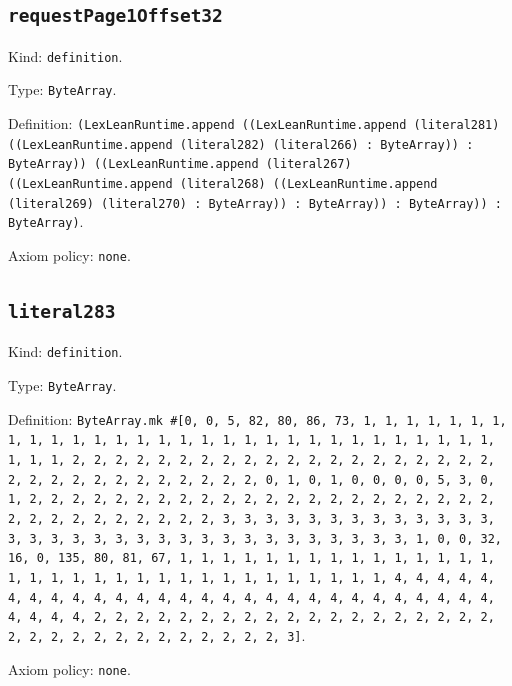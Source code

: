 \documentclass[11pt]{article}
\begin{document}
\subsection*{\texttt{requestPage1Offset32}}
\noindent Kind: \texttt{definition}.\par
\noindent Type: \texttt{ByteArray}.\par
\noindent Definition: \texttt{(LexLeanRuntime.append ((LexLeanRuntime.append (literal281) ((LexLeanRuntime.append (literal282) (literal266) : ByteArray)) : ByteArray)) ((LexLeanRuntime.append (literal267) ((LexLeanRuntime.append (literal268) ((LexLeanRuntime.append (literal269) (literal270) : ByteArray)) : ByteArray)) : ByteArray)) : ByteArray)}.\par
\noindent Axiom policy: \texttt{none}.\par
\subsection*{\texttt{literal283}}
\noindent Kind: \texttt{definition}.\par
\noindent Type: \texttt{ByteArray}.\par
\noindent Definition: \texttt{ByteArray.mk \#[0, 0, 5, 82, 80, 86, 73, 1, 1, 1, 1, 1, 1, 1, 1, 1, 1, 1, 1, 1, 1, 1, 1, 1, 1, 1, 1, 1, 1, 1, 1, 1, 1, 1, 1, 1, 1, 1, 1, 1, 2, 2, 2, 2, 2, 2, 2, 2, 2, 2, 2, 2, 2, 2, 2, 2, 2, 2, 2, 2, 2, 2, 2, 2, 2, 2, 2, 2, 2, 2, 2, 2, 0, 1, 0, 1, 0, 0, 0, 0, 5, 3, 0, 1, 2, 2, 2, 2, 2, 2, 2, 2, 2, 2, 2, 2, 2, 2, 2, 2, 2, 2, 2, 2, 2, 2, 2, 2, 2, 2, 2, 2, 2, 2, 2, 2, 3, 3, 3, 3, 3, 3, 3, 3, 3, 3, 3, 3, 3, 3, 3, 3, 3, 3, 3, 3, 3, 3, 3, 3, 3, 3, 3, 3, 3, 3, 3, 3, 1, 0, 0, 32, 16, 0, 135, 80, 81, 67, 1, 1, 1, 1, 1, 1, 1, 1, 1, 1, 1, 1, 1, 1, 1, 1, 1, 1, 1, 1, 1, 1, 1, 1, 1, 1, 1, 1, 1, 1, 1, 1, 1, 4, 4, 4, 4, 4, 4, 4, 4, 4, 4, 4, 4, 4, 4, 4, 4, 4, 4, 4, 4, 4, 4, 4, 4, 4, 4, 4, 4, 4, 4, 4, 4, 2, 2, 2, 2, 2, 2, 2, 2, 2, 2, 2, 2, 2, 2, 2, 2, 2, 2, 2, 2, 2, 2, 2, 2, 2, 2, 2, 2, 2, 2, 2, 2, 3]}.\par
\noindent Axiom policy: \texttt{none}.\par
\end{document}
